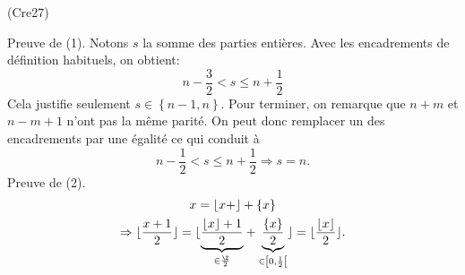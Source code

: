 \begin{tiny}(Cre27)\end{tiny} Preuve de (1). Notons $s$ la somme des parties entières. Avec les encadrements de définition habituels, on obtient:
\begin{displaymath}
  n- \frac{3}{2} < s \leq n + \frac{1}{2}
\end{displaymath}
Cela justifie seulement $s\in\left\lbrace n-1,n\right\rbrace$. Pour terminer, on remarque que $n+m$ et $n-m+1$ n'ont pas la même parité. On peut donc remplacer un des encadrements par une égalité ce qui conduit à
\begin{displaymath}
  n- \frac{1}{2} < s \leq n + \frac{1}{2} \Rightarrow s = n.
\end{displaymath}
Preuve de (2).
\begin{multline*}
  x = \lfloor x + \rfloor + \lbrace x \rbrace \\
  \Rightarrow \lfloor \frac{x+1}{2}\rfloor 
  = \lfloor \underset{\in \frac{\Z}{2}}{\underbrace{\frac{\lfloor x \rfloor +1}{2}}} 
  + \underset{\in \left[ 0, \frac{1}{2}\right[}{\underbrace{\frac{\lbrace x \rbrace}{2}}}\rfloor 
  = \lfloor \frac{\lfloor x \rfloor}{2} \rfloor.
\end{multline*}
